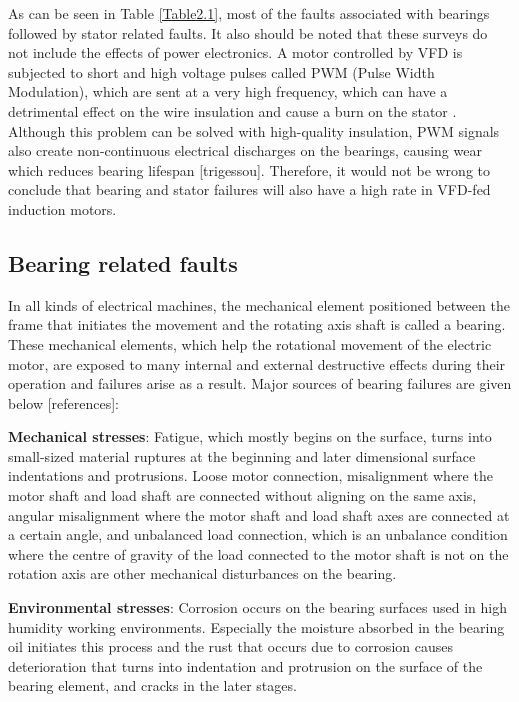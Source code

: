 As can be seen in Table \ref{Table2.1}, most of the faults associated with bearings followed by stator related faults. It also should be noted that these surveys do not include the effects of power electronics. A motor controlled by VFD is subjected to short and high voltage pulses called PWM (Pulse Width Modulation), which are sent at a very high frequency, which can have a detrimental effect on the wire insulation and cause a burn on the stator \cite{gunnar2016}. Although this problem can be solved with high-quality insulation, PWM signals also create non-continuous electrical discharges on the bearings, causing wear which reduces bearing lifespan [trigessou]. Therefore, it would not be wrong to conclude that bearing and stator failures will also have a high rate in VFD-fed induction motors.

\subsection{Bearing related faults}

In all kinds of electrical machines, the mechanical element positioned between the frame that initiates the movement and the rotating axis shaft is called a bearing. These mechanical elements, which help the rotational movement of the electric motor, are exposed to many internal and external destructive effects during their operation and failures arise as a result. Major sources of bearing failures are given below [references]:

\textbf{Mechanical stresses}: Fatigue, which mostly begins on the surface, turns into small-sized material ruptures at the beginning and later dimensional surface indentations and protrusions. Loose motor connection, misalignment where the motor shaft and load shaft are connected without aligning on the same axis, angular misalignment where the motor shaft and load shaft axes are connected at a certain angle, and unbalanced load connection, which is an unbalance condition where the centre of gravity of the load connected to the motor shaft is not on the rotation axis are other mechanical disturbances on the bearing.

\textbf{Environmental stresses}: Corrosion occurs on the bearing surfaces used in high humidity working environments. Especially the moisture absorbed in the bearing oil initiates this process and the rust that occurs due to corrosion causes deterioration that turns into indentation and protrusion on the surface of the bearing element, and cracks in the later stages.

